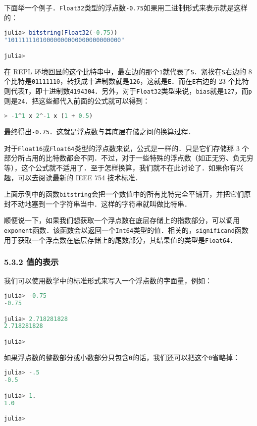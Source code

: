 下面举一个例子．\verb|Float32|类型的浮点数\verb|-0.75|如果用二进制形式来表示就是这样的：
\begin{lstlisting}[language=julia]
julia> bitstring(Float32(-0.75))
"10111111010000000000000000000000"

julia> 
\end{lstlisting}

在 REPL 环境回显的这个比特串中，最左边的那个\verb|1|就代表了\verb|S|．紧挨在\verb|S|右边的 8 个比特是\verb|01111110|，转换成十进制数就是\verb|126|，这就是\verb|E|．而在\verb|E|右边的 23 个比特则代表\verb|T|，即十进制数\verb|4194304|．另外，对于\verb|Float32|类型来说，\verb|bias|就是\verb|127|，而\verb|p|则是\verb|24|．把这些都代入前面的公式就可以得到：
\begin{lstlisting}[language=julia]
> -1^1 x 2^-1 x (1 + 0.5)
\end{lstlisting}
最终得出\verb|-0.75|．这就是浮点数与其底层存储之间的换算过程．

对于\verb|Float16|或\verb|Float64|类型的浮点数来说，公式是一样的．只是它们存储那 3 个部分所占用的比特数都会不同．不过，对于一些特殊的浮点数（如正无穷、负无穷等），这个公式就不适用了．至于怎样换算，我们就不在此讨论了．如果你有兴趣，可以去阅读最新的 IEEE 754 技术标准．

上面示例中的函数\verb|bitstring|会把一个数值中的所有比特完全平铺开，并把它们原封不动地塞到一个字符串当中．这样的字符串就叫做比特串．

顺便说一下，如果我们想获取一个浮点数在底层存储上的指数部分，可以调用\verb|exponent|函数．该函数会以返回一个\verb|Int64|类型的值．相关的，\verb|significand|函数用于获取一个浮点数在底层存储上的尾数部分，其结果值的类型是\verb|Float64|．

\subsubsection{5.3.2 值的表示}

我们可以使用数学中的标准形式来写入一个浮点数的字面量，例如：
\begin{lstlisting}[language=julia]
julia> -0.75
-0.75

julia> 2.718281828
2.718281828

julia> 
\end{lstlisting}

如果浮点数的整数部分或小数部分只包含\verb|0|的话，我们还可以把这个\verb|0|省略掉：
\begin{lstlisting}[language=julia]
julia> -.5
-0.5

julia> 1.
1.0

julia> 
\end{lstlisting}

